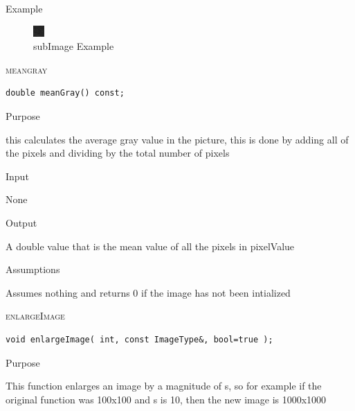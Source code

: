 \documentclass[pdftex, 11pt]{article}
\begin{document}
\begin{description}
\begin{description}
			\item{Example}

				\begin{figure}[h]
					\centering
					\caption{subImage Example}
					\includegraphics{images/outsubimg.png}
				\end{figure}

		\end{description}


	\item{\textsc{meangray}}
		\begin{description}

\begin{lstlisting}
double meanGray() const;
\end{lstlisting}

			\item{Purpose}

				
				this calculates the average gray value in the
				picture, this is done by adding
				all of the pixels and dividing by the total
				number of pixels

			\item{Input}

				None

			\item{Output}

				A double value that is the mean value of all
				the pixels in pixelValue


			\item{Assumptions}

				Assumes nothing and returns 0 if the image 
				has not been intialized

		\end{description}


	\item{\textsc{enlargeImage}}
		\begin{description}

\begin{lstlisting}
void enlargeImage( int, const ImageType&, bool=true );
\end{lstlisting}

			\item{Purpose}
				
				This function enlarges an image by a 
				magnitude of s, so for example if the
				original function was 100x100 and s is 
				10, then the new image is 1000x1000


\end{description}
\end{description}
\end{document}
